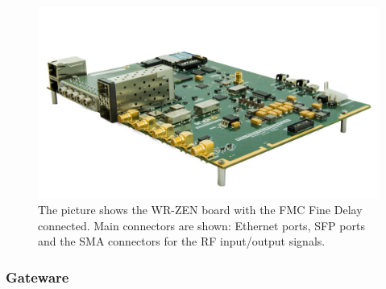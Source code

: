 
\begin{figure}[H]
    \centering
    \includegraphics[width=0.7\linewidth]{img/wrzen}
    \caption[WR-ZEN board picture]{The picture shows the WR-ZEN board with the FMC Fine Delay connected. Main connectors are shown: Ethernet ports, SFP ports and the SMA connectors for the RF input/output signals.}
    \label{fig:wrzen}
\end{figure}


\subsubsection{Gateware}

%
%

